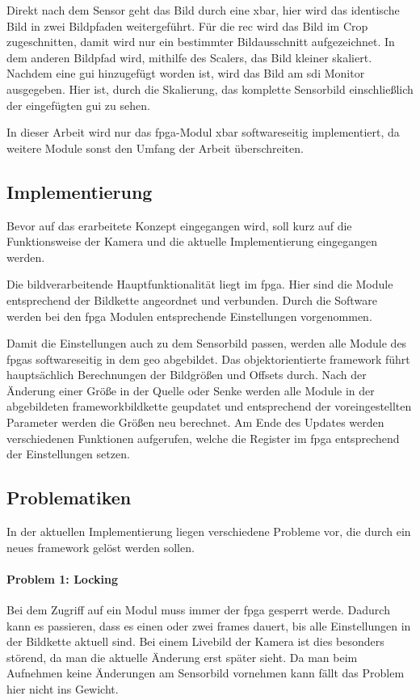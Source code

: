 Direkt nach dem Sensor geht das Bild durch eine \ac{xbar}, hier wird das identische Bild in zwei Bildpfaden weitergeführt. Für die \acl{rec} wird das Bild im Crop zugeschnitten, damit wird nur ein bestimmter Bildausschnitt aufgezeichnet. In dem anderen Bildpfad wird, mithilfe des Scalers, das Bild kleiner skaliert. Nachdem eine \ac{gui} hinzugefügt worden ist, wird das Bild am \ac{sdi} Monitor ausgegeben. Hier ist, durch die Skalierung, das komplette Sensorbild einschließlich der eingefügten \ac{gui} zu sehen.

In dieser Arbeit wird nur das \ac{fpga}-Modul \ac{xbar} softwareseitig implementiert, da weitere Module sonst den Umfang der Arbeit überschreiten.

\subsection{Implementierung}
Bevor auf das erarbeitete Konzept eingegangen wird, soll kurz auf die Funktionsweise der Kamera und die aktuelle Implementierung eingegangen werden.

Die bildverarbeitende Hauptfunktionalität liegt im \ac{fpga}. Hier sind die Module entsprechend der Bildkette angeordnet und verbunden. Durch die Software werden bei den \ac{fpga} Modulen entsprechende Einstellungen vorgenommen.

Damit die Einstellungen auch zu dem Sensorbild passen, werden alle Module des \ac{fpga}s softwareseitig in dem \ac{geo} abgebildet. Das objektorientierte \gls{framework} führt hauptsächlich Berechnungen der Bildgrößen und Offsets durch. Nach der Änderung einer Größe in der Quelle oder Senke werden alle Module in der abgebildeten \gls{framework}bildkette geupdatet und entsprechend der voreingestellten Parameter werden die Größen neu berechnet. Am Ende des Updates werden verschiedenen Funktionen aufgerufen, welche die Register im \ac{fpga} entsprechend der Einstellungen setzen.


\subsection{Problematiken}\label{sec:prob}
In der aktuellen Implementierung liegen verschiedene Probleme vor, die durch ein neues \gls{framework} gelöst werden sollen.

\paragraph*{Problem 1: Locking} Bei dem Zugriff auf ein Modul muss immer der \ac{fpga} gesperrt werde. Dadurch kann es passieren, dass es einen oder zwei \glspl{frame} dauert, bis alle Einstellungen in der Bildkette aktuell sind. Bei einem Livebild der Kamera ist dies besonders störend, da man die aktuelle Änderung erst später sieht. Da man beim Aufnehmen keine Änderungen am Sensorbild vornehmen kann fällt das Problem hier nicht ins Gewicht.

